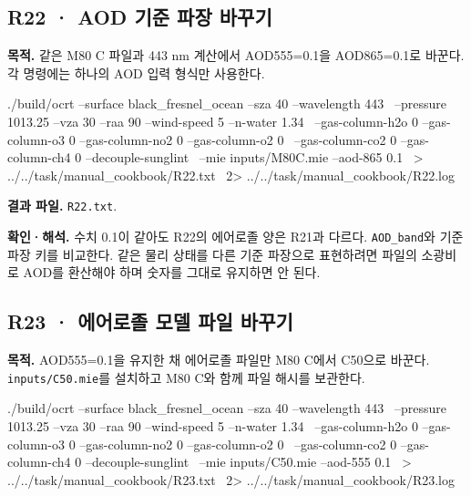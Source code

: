 
\subsection{R22 · AOD 기준 파장 바꾸기}
\label{sec:auto:09_cookbook:5.2}

\label{recipe:R22}

\textbf{목적. }같은 M80 C 파일과 443 nm 계산에서 AOD555=0.1을 AOD865=0.1로 바꾼다. 각 명령에는 하나의 AOD 입력 형식만 사용한다.

\noindent\begin{minipage}{\linewidth}
\begin{ManualCode}

./build/ocrt --surface black_fresnel_ocean --sza 40 --wavelength 443 \
  --pressure 1013.25 --vza 30 --raa 90 --wind-speed 5 --n-water 1.34 \
  --gas-column-h2o 0 --gas-column-o3 0 --gas-column-no2 0 --gas-column-o2 0 \
  --gas-column-co2 0 --gas-column-ch4 0 --decouple-sunglint \
  --mie inputs/M80C.mie --aod-865 0.1 \
  > ../../task/manual_cookbook/R22.txt \
  2> ../../task/manual_cookbook/R22.log

\end{ManualCode}
\end{minipage}\par

\textbf{결과 파일. }\texttt{R22.txt}.

\textbf{확인·해석. }수치 0.1이 같아도 R22의 에어로졸 양은 R21과 다르다. \texttt{AOD\_\allowbreak{}band}와 기준 파장 키를 비교한다. 같은 물리 상태를 다른 기준 파장으로 표현하려면 파일의 소광비로 AOD를 환산해야 하며 숫자를 그대로 유지하면 안 된다.


\subsection{R23 · 에어로졸 모델 파일 바꾸기}
\label{sec:auto:09_cookbook:5.3}

\label{recipe:R23}

\textbf{목적. }AOD555=0.1을 유지한 채 에어로졸 파일만 M80 C에서 C50으로 바꾼다. \texttt{inputs/\allowbreak{}C50.mie}를 설치하고 M80 C와 함께 파일 해시를 보관한다.

\noindent\begin{minipage}{\linewidth}
\begin{ManualCode}

./build/ocrt --surface black_fresnel_ocean --sza 40 --wavelength 443 \
  --pressure 1013.25 --vza 30 --raa 90 --wind-speed 5 --n-water 1.34 \
  --gas-column-h2o 0 --gas-column-o3 0 --gas-column-no2 0 --gas-column-o2 0 \
  --gas-column-co2 0 --gas-column-ch4 0 --decouple-sunglint \
  --mie inputs/C50.mie --aod-555 0.1 \
  > ../../task/manual_cookbook/R23.txt \
  2> ../../task/manual_cookbook/R23.log

\end{ManualCode}
\end{minipage}\par

